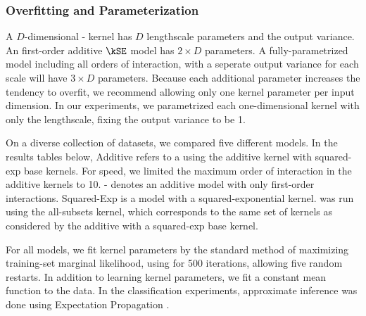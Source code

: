 \subsubsection{Overfitting and Parameterization}
A $D$-dimensional \kSE-\ARD{} kernel has $D$ lengthscale parameters and the output variance.
An first-order additive $\kSE$ model has $2 \times D$ parameters.
A fully-parametrized model including all orders of interaction, with a seperate output variance for each scale will have $3 \times D$ parameters.
Because each additional parameter increases the tendency to overfit, we recommend allowing only one kernel parameter per input dimension. 
%
%
In our experiments, we parametrized each one-dimensional kernel with only the lengthscale, fixing the output variance to be 1.

On a diverse collection of datasets, we compared five different models.
In the results tables below, \gp{} Additive refers to a \gp{} using the additive kernel with squared-exp base kernels.
For speed, we limited the maximum order of interaction in the additive kernels to 10.
\gp{}-\GAM{} denotes an additive \gp{} model with only first-order interactions.
\gp{} Squared-Exp is a \gp{} model with a squared-exponential \ARD{} kernel.
\HKL{} was run using the all-subsets kernel, which corresponds to the same set of kernels as considered by the additive \gp{} with a squared-exp base kernel.     

For all \gp{} models, we fit kernel parameters by the standard method of maximizing training-set marginal likelihood, using \LBFGS{} \citep{nocedal1980updating} for 500 iterations, allowing five random restarts.
In addition to learning kernel parameters, we fit a constant mean function to the data.
In the classification experiments, approximate \gp{} inference was done using Expectation Propagation \citep{minka2001expectation}.

